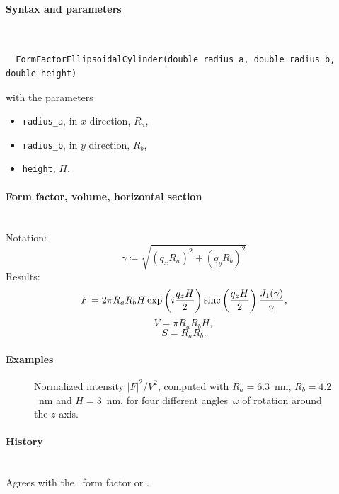 \paragraph{Syntax and parameters}\strut\\[-2ex plus .2ex minus .2ex]
\begin{lstlisting}
  FormFactorEllipsoidalCylinder(double radius_a, double radius_b, double height)
\end{lstlisting}
with the parameters
\begin{itemize}
\item \texttt{radius\_a}, in $x$ direction, $R_a$,
\item \texttt{radius\_b}, in $y$ direction, $R_b$,
\item \texttt{height}, $H$.
\end{itemize}

\paragraph{Form factor, volume, horizontal section}\strut\\
Notation:
\begin{equation*}
  \gamma \coloneqq \sqrt{(q_x R_a)^2+(q_y R_b)^2}
\end{equation*}
Results:
\begin{equation*}
F = 2\pi R_a R_b H \exp\left(i\frac{q_z H}{2}\right)
   \operatorname{sinc}\left(\frac{q_z H}{2}\right) \frac{J_1(\gamma)}{\gamma},
\end{equation*}
\begin{equation*}
  V = \pi R_a R_bH,
\end{equation*}
\begin{equation*}
  S = R_a R_b.
\end{equation*}

\paragraph{Examples}\strut

\begin{figure}[H]
\begin{center}
\end{center}
\caption{Normalized intensity $|F|^2/V^2$,
computed with $R_a=6.3$~nm, $R_b=4.2$~nm and $H=3$~nm,
for four different angles~$\omega$ of rotation around the $z$ axis.}
\end{figure}

\paragraph{History}\strut\\
Agrees with the \IsGISAXS\ form factor
 \cite[Eq.~2.41, wrongly labeled in Fig.~2.4]{Laz06}
or  \cite[Eq.~224]{ReLL09}.


